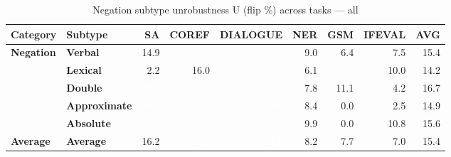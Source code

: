 \begin{table}[!tbp]
\centering
\footnotesize
\begin{adjustbox}{max width=\linewidth}
\begin{tabular}{llrrrrrrr}
\toprule
\textbf{Category} & \textbf{Subtype} & \textbf{SA} & \textbf{COREF} & \textbf{DIALOGUE} & \textbf{NER} & \textbf{GSM} & \textbf{IFEVAL} & \textbf{AVG} \\
\midrule
\textbf{Negation} & \textbf{Verbal} & \cellcolor{blue!38} 14.9 & \cellcolor{blue!69} \textcolor{white}{26.7} & \cellcolor{blue!72} \textcolor{white}{27.8} & \cellcolor{blue!23} 9.0 & \cellcolor{blue!17} 6.4 & \cellcolor{blue!19} 7.5 & \cellcolor{blue!40} 15.4 \\
 & \textbf{Lexical} & \cellcolor{blue!6} 2.2 & \cellcolor{blue!41} 16.0 & \cellcolor{blue!78} \textcolor{white}{30.2} & \cellcolor{blue!16} 6.1 & \cellcolor{blue!54} \textcolor{white}{21.0} & \cellcolor{blue!26} 10.0 & \cellcolor{blue!37} 14.2 \\
 & \textbf{Double} & \cellcolor{blue!58} \textcolor{white}{22.5} & \cellcolor{blue!52} \textcolor{white}{20.0} & \cellcolor{blue!80} \textcolor{white}{34.8} & \cellcolor{blue!20} 7.8 & \cellcolor{blue!29} 11.1 & \cellcolor{blue!11} 4.2 & \cellcolor{blue!43} 16.7 \\
 & \textbf{Approximate} & \cellcolor{blue!49} \textcolor{white}{19.1} & \cellcolor{blue!74} \textcolor{white}{28.5} & \cellcolor{blue!79} \textcolor{white}{30.8} & \cellcolor{blue!22} 8.4 & \cellcolor{blue!0} 0.0 & \cellcolor{blue!6} 2.5 & \cellcolor{blue!38} 14.9 \\
 & \textbf{Absolute} & \cellcolor{blue!57} \textcolor{white}{22.2} & \cellcolor{blue!65} \textcolor{white}{25.0} & \cellcolor{blue!66} \textcolor{white}{25.6} & \cellcolor{blue!26} 9.9 & \cellcolor{blue!0} 0.0 & \cellcolor{blue!28} 10.8 & \cellcolor{blue!40} 15.6 \\
\midrule
\textbf{Average} & \textbf{Average} & \cellcolor{blue!42} 16.2 & \cellcolor{blue!60} \textcolor{white}{23.2} & \cellcolor{blue!77} \textcolor{white}{29.8} & \cellcolor{blue!21} 8.2 & \cellcolor{blue!20} 7.7 & \cellcolor{blue!18} 7.0 & \cellcolor{blue!40} 15.4 \\
\bottomrule
\end{tabular}
\end{adjustbox}
\caption{Negation subtype unrobustness U (flip \%) across tasks — all}
\label{tab:negation_subtype_unrob}
\end{table}